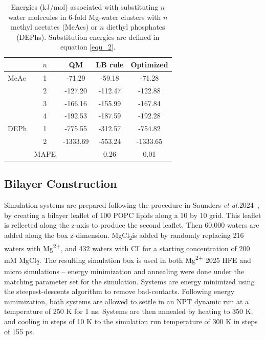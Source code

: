 \documentclass[journal=langd5,manuscript=article]{achemso}
\newcommand{\etal}{\textit{et al.}}
\newcommand{\mg}{Mg\textsuperscript{2+}}
\newcommand{\cl}{Cl\textsuperscript{-}}
\newcommand{\mgcl}{MgCl\textsubscript{2}}
\begin{document}
\begin{table}[h!]
\centering
\begin{tabular}{lcccc}
\hline
 & $n$ & QM & LB rule & Optimized \\
\hline
MeAc  & 1 & -71.29   &    -59.18& -71.28  \\\hline
    & 2 & -127.20  &   -112.47& -122.88 \\\hline
    & 3 & -166.16  &   -155.99& -167.84 \\\hline
    & 4 & -192.53  &   -187.59& -192.28 \\\hline
DEPh & 1 & -775.55  &   -312.57& -754.82 \\\hline
    & 2 & -1333.69 &   -553.24& -1333.65 \\\hline
\hline
         & MAPE & &0.26 &0.01 \\
\hline
\end{tabular}
\caption{Energies (kJ/mol) associated with substituting $n$ water molecules in 6-fold Mg-water clusters with $n$ methyl acetates (MeAcs) or $n$ diethyl phosphates (DEPhs). Substitution energies are defined in equation \ref{equ_2}.}
\label{tab:subenergies}
\end{table}




\subsection{Bilayer Construction}
Simulation systems are prepared following the procedure in Saunders \etal 2024~\cite{saunders:2024},
by creating a bilayer leaflet of 100 POPC lipids along a 10 by 10 grid. This leaflet is reflected along the z-axis to produce the second leaflet. Then
60,000 waters are added along the box z-dimension. \mgcl is added by randomly replacing 216 waters with \mg{}, and 432 waters with \cl{} for a starting concentration of 200 mM \mgcl. The resulting simulation box
is used in both \mg{ 2025} HFE and micro simulations -- energy minimization and annealing were done under the matching parameter set for the simulation.
Systems are energy minimized using the steepest-descents algorithm to remove bad-contacts. Following energy
minimization, both systems are allowed to settle in an NPT dynamic
run at a temperature of 250 K for 1 ns. Systems are then annealed by
heating to 350 K, and cooling in steps of 10 K to the simulation run temperature of 300 K in steps of 155 ps. 
\end{document}
